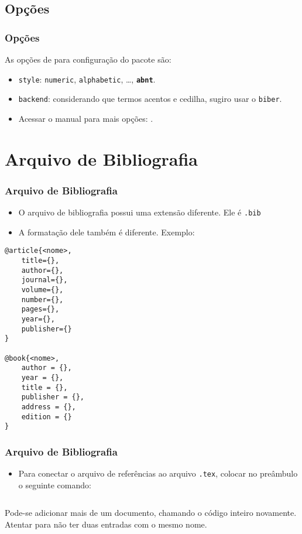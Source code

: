 \documentclass[brazilian,a4paper]{beamer}
\begin{document}
\subsection{Opções}
\begin{frame}[fragile]
    \frametitle{Opções}

    As opções de para configuração do pacote são:
    \begin{itemize}
        \item \texttt{style}: \texttt{numeric}, \texttt{alphabetic}, \ldots, \texttt{\bfseries abnt}.
        \item \texttt{backend}: considerando que termos acentos e cedilha, sugiro usar o \texttt{biber}.
        \item Acessar o manual para mais opções: .
    \end{itemize}

\end{frame}

\section{Arquivo de Bibliografia}
\begin{frame}
    \frametitle{Arquivo de Bibliografia}

    \begin{itemize}
        \item O arquivo de bibliografia possui uma extensão diferente. Ele é \texttt{.bib}
        \item A formatação dele também é diferente. Exemplo:
    \end{itemize}
\begin{lstlisting}[style=myStyleLatex]
@article{<nome>,
    title={},
    author={},
    journal={},
    volume={},
    number={},
    pages={},
    year={},
    publisher={}
}

@book{<nome>,
    author = {},
    year = {},
    title = {},
    publisher = {},
    address = {},
    edition = {}
}
\end{lstlisting}
\end{frame}

\begin{frame}[fragile]
    \frametitle{Arquivo de Bibliografia}

    \begin{itemize}
        \item Para conectar o arquivo de referências ao arquivo \texttt{.tex}, colocar no preâmbulo o seguinte comando:
    \end{itemize}
\begin{lstlisting}[style=myStyleLatex]

\end{lstlisting}

    Pode-se adicionar mais de um documento, chamando o código inteiro novamente. Atentar para não ter duas entradas com o mesmo nome.

\end{frame}
\end{document}
